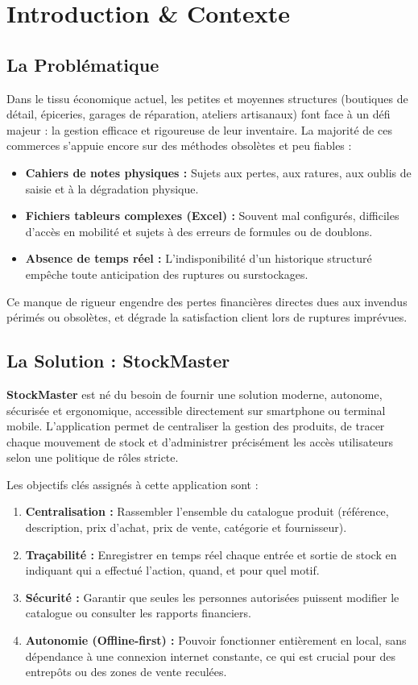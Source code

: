 \documentclass[12pt,a4paper]{report}
\begin{document}
\chapter{Introduction \& Contexte}

\section{La Problématique}
Dans le tissu économique actuel, les petites et moyennes structures (boutiques de détail, épiceries, garages de réparation, ateliers artisanaux) font face à un défi majeur : la gestion efficace et rigoureuse de leur inventaire. 
La majorité de ces commerces s'appuie encore sur des méthodes obsolètes et peu fiables :
\begin{itemize}
    \item \textbf{Cahiers de notes physiques :} Sujets aux pertes, aux ratures, aux oublis de saisie et à la dégradation physique.
    \item \textbf{Fichiers tableurs complexes (Excel) :} Souvent mal configurés, difficiles d'accès en mobilité et sujets à des erreurs de formules ou de doublons.
    \item \textbf{Absence de temps réel :} L'indisponibilité d'un historique structuré empêche toute anticipation des ruptures ou surstockages.
\end{itemize}

Ce manque de rigueur engendre des pertes financières directes dues aux invendus périmés ou obsolètes, et dégrade la satisfaction client lors de ruptures imprévues.

\section{La Solution : StockMaster}
\textbf{StockMaster} est né du besoin de fournir une solution moderne, autonome, sécurisée et ergonomique, accessible directement sur smartphone ou terminal mobile. L'application permet de centraliser la gestion des produits, de tracer chaque mouvement de stock et d'administrer précisément les accès utilisateurs selon une politique de rôles stricte.

Les objectifs clés assignés à cette application sont :
\begin{enumerate}
    \item \textbf{Centralisation :} Rassembler l'ensemble du catalogue produit (référence, description, prix d'achat, prix de vente, catégorie et fournisseur).
    \item \textbf{Traçabilité :} Enregistrer en temps réel chaque entrée et sortie de stock en indiquant qui a effectué l'action, quand, et pour quel motif.
    \item \textbf{Sécurité :} Garantir que seules les personnes autorisées puissent modifier le catalogue ou consulter les rapports financiers.
    \item \textbf{Autonomie (Offline-first) :} Pouvoir fonctionner entièrement en local, sans dépendance à une connexion internet constante, ce qui est crucial pour des entrepôts ou des zones de vente reculées.
\end{enumerate}
\end{document}
